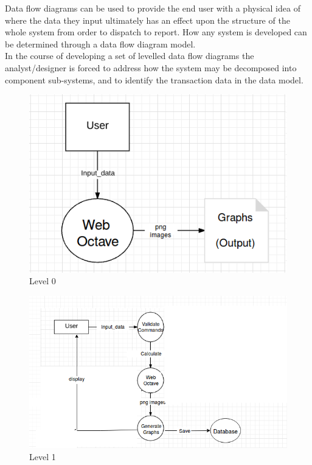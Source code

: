 Data flow diagrams can be used to provide the end user with a physical idea of where the data they input ultimately has an effect upon the structure of the whole system from order to dispatch to report. How any system is developed can be determined through a data flow diagram model.\\
In the course of developing a set of levelled data flow diagrams the analyst/designer is forced to address how the system may be decomposed into component sub-systems, and to identify the transaction data in the data model.
\begin{figure}[!th]
\centering
\includegraphics[width=0.7\linewidth]{input/images/final0.png}
\caption{Level 0}
\label{fig:image1}
\end{figure}

\begin{figure}[!th]
\centering
\includegraphics[width=0.7\linewidth]{input/images/final1.png}
\caption{Level 1}
\label{fig:image1}
\end{figure}

